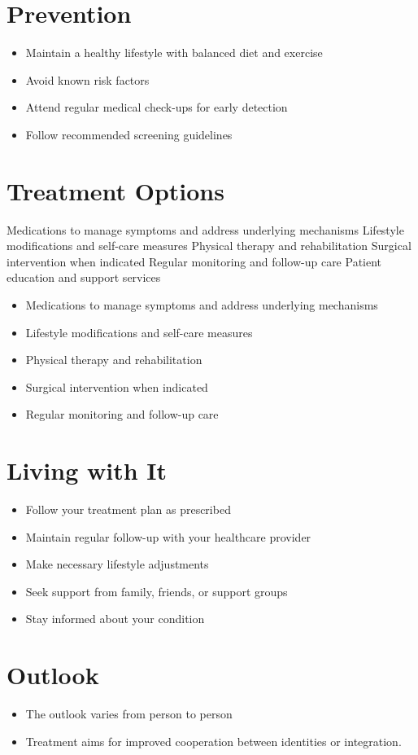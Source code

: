 \section{Prevention}
\begin{itemize}[noitemsep]
  \item Maintain a healthy lifestyle with balanced diet and exercise
  \item Avoid known risk factors
  \item Attend regular medical check-ups for early detection
  \item Follow recommended screening guidelines
\end{itemize}
\section{Treatment Options}
Medications to manage symptoms and address underlying mechanisms Lifestyle modifications and self-care measures Physical therapy and rehabilitation Surgical intervention when indicated Regular monitoring and follow-up care Patient education and support services

\begin{itemize}[noitemsep]
  \item Medications to manage symptoms and address underlying mechanisms
  \item Lifestyle modifications and self-care measures
  \item Physical therapy and rehabilitation
  \item Surgical intervention when indicated
  \item Regular monitoring and follow-up care
\end{itemize}
\section{Living with It}
\begin{itemize}[noitemsep]
  \item Follow your treatment plan as prescribed
  \item Maintain regular follow-up with your healthcare provider
  \item Make necessary lifestyle adjustments
  \item Seek support from family, friends, or support groups
  \item Stay informed about your condition
\end{itemize}
\section{Outlook}
\begin{itemize}[noitemsep]
  \item The outlook varies from person to person
  \item Treatment aims for improved cooperation between identities or integration.
\end{itemize}
